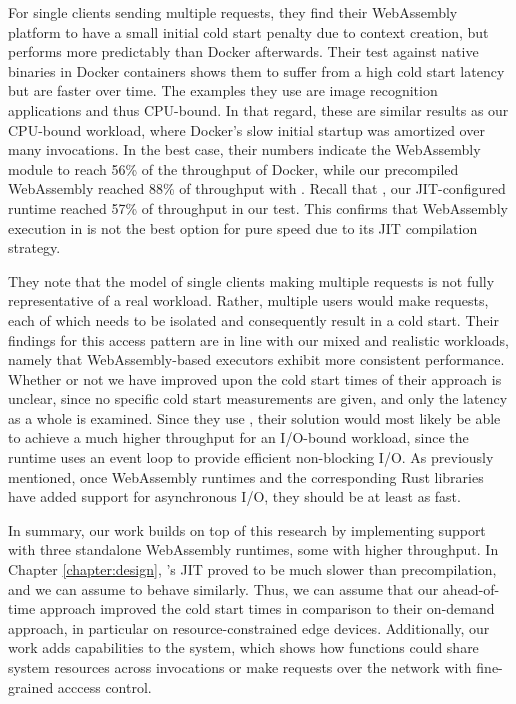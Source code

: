 For single clients sending multiple requests, they find their WebAssembly platform to have a small initial cold start penalty due to context creation, but performs more predictably than Docker afterwards. Their test against native binaries in Docker containers shows them to suffer from a high cold start latency but are faster over time. The examples they use are image recognition applications and thus CPU-bound. In that regard, these are similar results as our CPU-bound workload, where Docker's slow initial startup was amortized over many invocations.
In the best case, their numbers indicate the WebAssembly module to reach 56\% of the throughput of Docker, while our precompiled WebAssembly reached 88\% of throughput with . Recall that , our JIT-configured runtime reached 57\% of throughput in our test. This confirms that WebAssembly execution in  is not the best option for pure speed due to its JIT compilation strategy.

They note that the model of single clients making multiple requests is not fully representative of a real workload. Rather, multiple users would make requests, each of which needs to be isolated and consequently result in a cold start. Their findings for this access pattern are in line with our mixed and realistic workloads, namely that WebAssembly-based executors exhibit more consistent performance. Whether or not we have improved upon the cold start times of their approach is unclear, since no specific cold start measurements are given, and only the latency as a whole is examined. 
Since they use , their solution would most likely be able to achieve a much higher throughput for an I/O-bound workload, since the runtime uses an event loop to provide efficient non-blocking I/O. As previously mentioned, once WebAssembly runtimes and the corresponding Rust libraries have added support for asynchronous I/O, they should be at least as fast.

In summary, our work builds on top of this research by implementing support with three standalone WebAssembly runtimes, some with higher throughput. In Chapter \ref{chapter:design}, 's JIT proved to be much slower than precompilation, and we can assume  to behave similarly. Thus, we can assume that our ahead-of-time approach improved the cold start times in comparison to their on-demand approach, in particular on resource-constrained edge devices. Additionally, our work adds capabilities to the system, which shows how functions could share system resources across invocations or make requests over the network with fine-grained acccess control.
